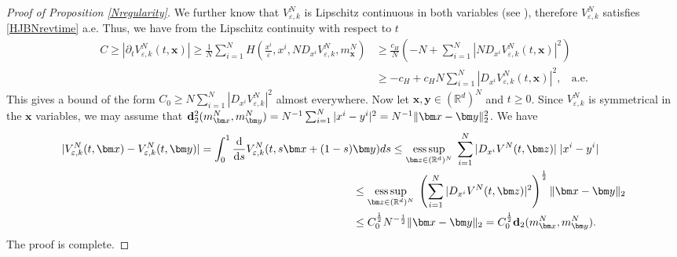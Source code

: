 \documentclass[reqno,11pt]{amsart}
\DeclareMathOperator*{\esssup}{ess\,sup}
\numberwithin{equation}{section}
\newcommand{\R}{\mathbb{R}} %
\newcommand{\e}{\varepsilon}
\newcommand{\nd}{\noindent}
\begin{document}
\begin{proof}[Proof of Proposition \ref{Nregularity}]
\nd
We further know that $V^N_{\e,k}$ is Lipschitz continuous in both variables (see \cite[Theorem 1.34]{tran_hamilton-jacobi_2021}), therefore $V^N_{\e,k}$ satisfies \eqref{HJBNrevtime} a.e. Thus, we have from the Lipschitz continuity with respect to $t$
\begin{align*}
    C\ge |\partial_tV^N_{\e,k}(t,\bm x)|\ge \frac{1}{N}\sum_{i=1}^NH\left(\frac{x^i}{\e},x^i,ND_{x^i}V^N_{\e,k},m_{\bm x}^N\right)&\ge \frac{c_H}{N}\left(-N+\sum_{i=1}^N|ND_{x^i}V^N_{\e,k}(t,\bm x)|^{2}\right)\\
    &\ge -c_H +c_HN\sum_{i=1}^N|D_{x^i}V^N_{\e,k}(t,\bm x)|^{2},\;\;\text{ a.e.}
\end{align*}
This gives a bound of the form $C_0\ge N\sum_{i=1}^N|D_{x^i}V^N_{\e,k}|^{2}$ almost everywhere. Now let $\bm x,\bm y\in (\R^d)^N$ and $t\ge 0$. Since $V^N_{\e,k}$ is symmetrical in the $\bm x$ variables, we may assume that ${\bf d}_{2}^2(m^N_{\bm x}, m^N_{\bm y})=N^{-1}\sum_{i=1}^N|x^i-y^i|^2=N^{-1}\|\bm x-\bm y\|_2^2$. We have
\begin{align*}
    |V^N_{\e,k}(t,\bm x)-V^N_{\e,k}(t,\bm y)|= \int_0^1\frac{\text{d}}{\text{d}s} V^N_{\e,k}(t, s\bm x+(1-s)&\bm y)ds\le \esssup_{\bm z\in(\R^d)^N}\;\sum_{i=1}^N|D_{x^i}V^N(t,\bm z)|\;|x^i-y^i|\\
    &\le \esssup_{\bm z\in(\R^d)^N}\;\left(\sum_{i=1}^N |D_{x^i}V^N(t,\bm z)|^{2}  \right)^{\frac{1}{2}}\|\bm x-\bm y\|_2\\
    &\le C_0^{\frac{1}{2}}N^{-\frac{1}{2}}\|\bm x-\bm y\|_2=C_0^{\frac{1}{2}}{\bf d}_2(m^N_{\bm x},m^N_{\bm y}).
\end{align*}
The proof is complete.
\end{proof}
\end{document}
